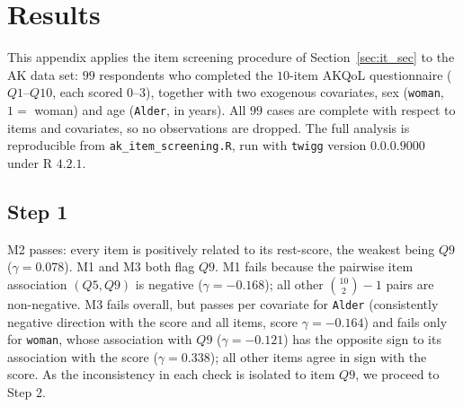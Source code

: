 
\section{Results}

This appendix applies the item screening procedure of Section~\ref{sec:it_sec} to the AK data set: $99$ respondents who completed the $10$-item AKQoL questionnaire ($Q1$--$Q10$, each scored $0$--$3$), together with two exogenous covariates, sex (\texttt{woman}, $1=$ woman) and age (\texttt{Alder}, in years). All $99$ cases are complete with respect to items and covariates, so no observations are dropped. The full analysis is reproducible from \texttt{ak\_item\_screening.R}, run with \texttt{twigg} version $0.0.0.9000$ under R $4.2.1$.

\subsection{Step 1}
M2 passes: every item is positively related to its rest-score, the weakest being $Q9$ ($\gamma=0.078$). M1 and M3 both flag $Q9$. M1 fails because the pairwise item association $(Q5,Q9)$ is negative ($\gamma=-0.168$); all other $\binom{10}{2}-1$ pairs are non-negative. M3 fails overall, but passes per covariate for \texttt{Alder} (consistently negative direction with the score and all items, score $\gamma=-0.164$) and fails only for \texttt{woman}, whose association with $Q9$ ($\gamma=-0.121$) has the opposite sign to its association with the score ($\gamma=0.338$); all other items agree in sign with the score. As the inconsistency in each check is isolated to item $Q9$, we proceed to Step 2.

